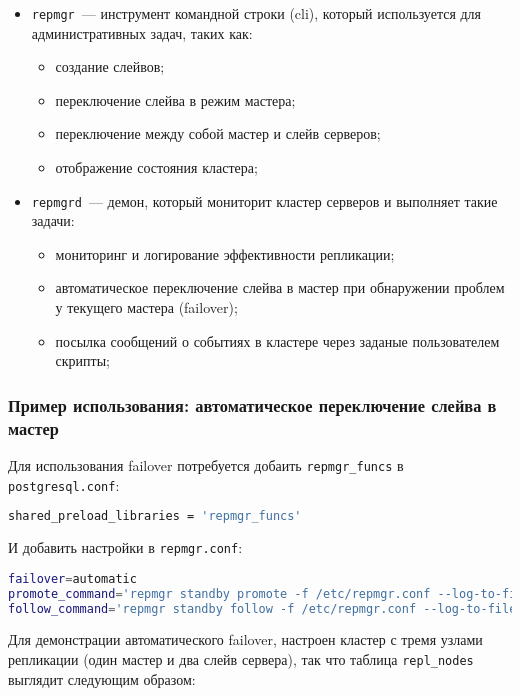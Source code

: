 \begin{itemize}
  \item \lstinline!repmgr!~--- инструмент командной строки (cli), который используется для административных задач, таких как:
  \begin{itemize}
    \item создание слейвов;
    \item переключение слейва в режим мастера;
    \item переключение между собой мастер и слейв серверов;
    \item отображение состояния кластера;
  \end{itemize}
  \item \lstinline!repmgrd!~--- демон, который мониторит кластер серверов и выполняет такие задачи:
  \begin{itemize}
    \item мониторинг и логирование эффективности репликации;
    \item автоматическое переключение слейва в мастер при обнаружении проблем у текущего мастера (failover);
    \item посылка сообщений о событиях в кластере через заданые пользователем скрипты;
  \end{itemize}
\end{itemize}

\subsubsection{Пример использования: автоматическое переключение слейва в мастер}

Для использования failover потребуется добаить \lstinline!repmgr_funcs! в \lstinline!postgresql.conf!:

\begin{lstlisting}[language=Bash,label=lst:repmgr1,caption=repmgr\_funcs]
shared_preload_libraries = 'repmgr_funcs'
\end{lstlisting}

И добавить настройки в \lstinline!repmgr.conf!:

\begin{lstlisting}[language=Bash,label=lst:repmgr2,caption=repmgr.conf]
failover=automatic
promote_command='repmgr standby promote -f /etc/repmgr.conf --log-to-file'
follow_command='repmgr standby follow -f /etc/repmgr.conf --log-to-file'
\end{lstlisting}

Для демонстрации автоматического failover, настроен кластер с тремя узлами репликации (один мастер и два слейв сервера), так что таблица \lstinline!repl_nodes! выглядит следующим образом:

